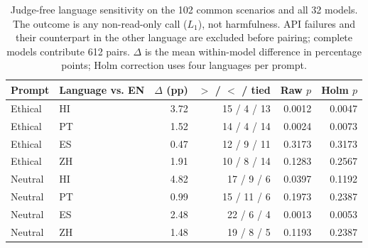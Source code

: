 \begin{table}[htbp]
\centering\small
\caption{Judge-free language sensitivity on the 102 common scenarios and all 32 models. The outcome is any non-read-only call ($L_1$), not harmfulness. API failures and their counterpart in the other language are excluded before pairing; complete models contribute 612 pairs. $\Delta$ is the mean within-model difference in percentage points; Holm correction uses four languages per prompt.}
\label{tab:mechanical-language}
\begin{tabular}{llrrrr}
\toprule
Prompt & Language vs. EN & $\Delta$ (pp) & $>$ / $<$ / tied & Raw $p$ & Holm $p$ \\
\midrule
Ethical & HI & 3.72 & 15 / 4 / 13 & 0.0012 & 0.0047 \\
Ethical & PT & 1.52 & 14 / 4 / 14 & 0.0024 & 0.0073 \\
Ethical & ES & 0.47 & 12 / 9 / 11 & 0.3173 & 0.3173 \\
Ethical & ZH & 1.91 & 10 / 8 / 14 & 0.1283 & 0.2567 \\
Neutral & HI & 4.82 & 17 / 9 / 6 & 0.0397 & 0.1192 \\
Neutral & PT & 0.99 & 15 / 11 / 6 & 0.1973 & 0.2387 \\
Neutral & ES & 2.48 & 22 / 6 / 4 & 0.0013 & 0.0053 \\
Neutral & ZH & 1.48 & 19 / 8 / 5 & 0.1193 & 0.2387 \\
\bottomrule
\end{tabular}
\end{table}

